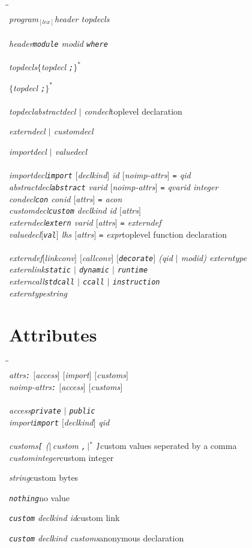 \documentclass[a4paper,dvips]{article}
\newcommand{\ttlcurly}{\char123}
\newcommand{\ttrcurly}{\char125}
\newenvironment{productions}%
  {\begin{tabbing}\hspace{2cm}\=\hspace{6cm}\=\kill{}\\}%
  {\end{tabbing}}
\newcommand{\fixed}[1]{\makebox[3.5em]{#1}}
\newcommand{\production}[3]{\nont{#1}\>\fixed{$\rightarrow$}\nont{#2}\>#3\\}
\newcommand{\next}[2]{\strut{}\>\fixed{$|$}\nont{#1}\>#2\\}
\newcommand{\nont}[1]{\textit{#1}}
\newcommand{\pspace}{\hspace{0.25ex}}
\newcommand{\opt}[1]{$[$#1$]$}
\newcommand{\many}[1]{$\{$#1\pspace$\}^*$}
\newcommand{\bananas}[2]{{\rm (}\hspace{-0.5ex}$|\,$#1\pspace$\,|$\hspace{-0.5ex}{\rm )}$^{#2}$}
\newcommand{\sepby}[2]{\bananas{#1 #2}{*}}
\newcommand{\termby}[2]{\many{#1 #2}}
\newcommand{\term}[1]{{\tt #1}}
\newcommand{\por}{$|$}
\newcommand{\pgroup}[1]{{\rm(}#1{\rm{})}}
\newcommand{\lex}[2]{\nont{#2}$_{[\nont{#1}]}$}
\begin{document}
\begin{productions}
\production{\lex{lex}{program}}{header topdecls}{}
\\
\production{header}{\term{module} modid \term{where}}{}
\\
\production{topdecls}{\termby{topdecl}{\term{;}} }{}
\next{\term{\ttlcurly} \termby{topdecl}{\term{;}} \term{\ttrcurly} }{}
\\
\production{topdecl}{abstractdecl \por{} condecl}{toplevel declaration}
\next{externdecl \por{} customdecl}{}
\next{importdecl \por{} valuedecl}{}
\\
\production{importdecl}{\term{import} \opt{declkind} id \opt{noimp-attrs} \term{=} qid}{}
\production{abstractdecl}{\term{abstract} varid \opt{noimp-attrs} \term{=} qvarid integer}{}
\production{condecl}{\term{con} conid \opt{attrs} \term{=} acon}{}
\production{customdecl}{\term{custom} \nont{declkind} \nont{id} \opt{\nont{attrs}}}{}
\production{externdecl}{\term{extern} varid \opt{attrs} \term{=} externdef}{}
\production{valuedecl}{\opt{\term{val}} lhs \opt{attrs} \term{=} expr}{toplevel function declaration}
\\
\production{externdef}{\opt{linkconv} \opt{callconv} \opt{\term{decorate}} \pgroup{qid \por{} modid} externtype}{}
\production{externlink}{\term{static} \por{} \term{dynamic} \por{} \term{runtime}}{}
\production{externcall}{\term{stdcall} \por{} \term{ccall} \por{} \term{instruction}}{}
\production{externtype}{string}{}
\end{productions}



\section{Attributes}

\begin{productions}
\production{attrs}{\term{:} \opt{access} \opt{import} \opt{customs}}{}
\production{noimp-attrs}{\term{:} \opt{access} \opt{customs}}{}
\\
\production{access}{\term{private} \por{} \term{public}}{}
\production{import}{\term{import} \opt{declkind} qid}{}
\\
\production{customs}{\term{[} \sepby{custom}{\term{,}} \term{]}}{custom values seperated by a comma}
\production{custom}{\nont{integer}}{custom integer}
\next{\nont{string}}{custom bytes}
\next{\term{nothing}}{no value}
\next{\term{custom} \nont{declkind} \nont{id}}{custom link}
\next{\term{custom} \nont{declkind} \nont{customs}}{anonymous declaration}
\end{productions}
\end{document}
